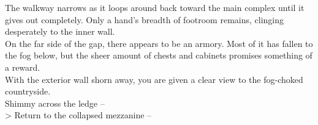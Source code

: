 The walkway narrows as it loops around back toward the main complex until it gives out completely. Only a hand’s breadth of footroom remains, clinging desperately to the inner wall.\\

On the far side of the gap, there appears to be an armory. Most of it has fallen to the fog below, but the sheer amount of chests and cabinets promises something of a reward.\\

With the exterior wall shorn away, you are given a clear view to the fog-choked countryside.\\

 Shimmy across the ledge -- \\
> Return to the collapsed mezzanine -- 